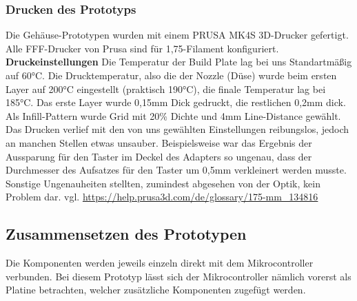 \documentclass[]{article}
\begin{document}
\subsubsection{Drucken des Prototyps}
Die Gehäuse-Prototypen wurden mit einem \glqq PRUSA MK4S\grqq{} 3D-Drucker gefertigt. Alle FFF-Drucker von Prusa sind für 1,75-Filament konfiguriert.
\vspace{4mm}\newline
\textbf{Druckeinstellungen} \newline
Die Temperatur der Build Plate lag bei uns Standartmäßig auf 60°C. Die Drucktemperatur, also die der Nozzle (Düse) wurde beim ersten Layer auf 200°C eingestellt (praktisch 190°C), die finale Temperatur lag bei 185°C. \newline
Das erste Layer wurde 0,15mm Dick gedruckt, die restlichen 0,2mm dick. \newline
Als Infill-Pattern wurde \glqq Grid\grqq{} mit 20\% Dichte und 4mm Line-Distance gewählt. \newline
Das Drucken verlief mit den von uns gewählten Einstellungen reibungslos, jedoch an manchen Stellen etwas unsauber. Beispielsweise war das Ergebnis der Aussparung für den Taster im Deckel des Adapters so ungenau, dass der Durchmesser des Aufsatzes für den Taster um 0,5mm verkleinert werden musste. Sonstige Ungenauheiten stellten, zumindest abgesehen von der Optik, kein Problem dar.
\vspace{4mm}\newline
vgl. \url{https://help.prusa3d.com/de/glossary/175-mm_134816}
\subsection{Zusammensetzen des Prototypen}
Die Komponenten werden jeweils einzeln direkt mit dem Mikrocontroller verbunden. Bei diesem Prototyp lässt sich der Mikrocontroller nämlich vorerst als Platine betrachten, welcher zusätzliche Komponenten zugefügt werden.
\end{document}
